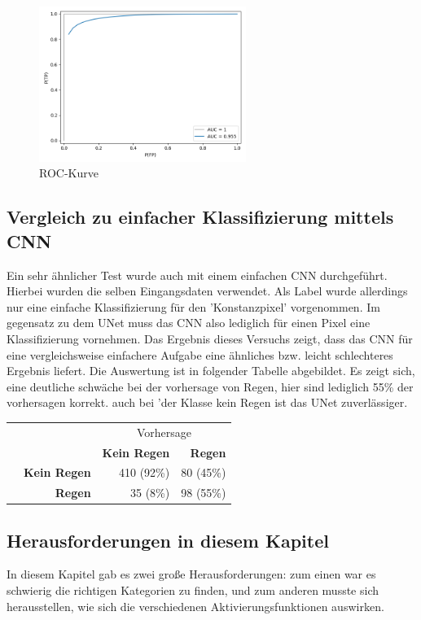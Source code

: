 \begin{figure}[H]
	\centering
	\includegraphics[width=0.6\textwidth]{pics/ROC-curve.PNG}
	\caption{ROC-Kurve}
	\label{roc2}
\end{figure}



\subsection{Vergleich zu einfacher Klassifizierung mittels CNN}
Ein sehr ähnlicher Test wurde auch mit einem einfachen CNN durchgeführt. Hierbei wurden die selben Eingangsdaten verwendet. Als Label wurde allerdings nur eine einfache Klassifizierung für den 'Konstanzpixel' vorgenommen. Im gegensatz zu dem UNet muss das CNN also lediglich für einen Pixel eine Klassifizierung vornehmen. Das Ergebnis dieses Versuchs zeigt, dass das CNN für eine vergleichsweise einfachere Aufgabe eine ähnliches bzw. leicht schlechteres Ergebnis liefert. Die Auswertung ist in folgender Tabelle abgebildet. Es zeigt sich, eine deutliche schwäche bei der vorhersage von Regen, hier sind lediglich 55\% der vorhersagen korrekt. auch bei 'der Klasse kein Regen ist das UNet zuverlässiger.

\begin{tabular}{lr|rr}
	&                      & \multicolumn{2}{c}{Vorhersage}\\
	&                      & \textbf{Kein Regen} & \textbf{Regen}\\\hline
	\multirow{3}{*}{\rotatebox{90}{Daten}}
	& \textbf{Kein Regen}  & 410 (92\%)    & 80 (45\%)\\
	& \textbf{Regen}       & 35 (8\%)       & 98 (55\%)\\
\end{tabular}


\subsection{Herausforderungen in diesem Kapitel}
In diesem Kapitel gab es zwei große Herausforderungen: zum einen war es schwierig die richtigen Kategorien zu finden, und zum anderen musste sich herausstellen, wie sich die verschiedenen Aktivierungsfunktionen auswirken.

